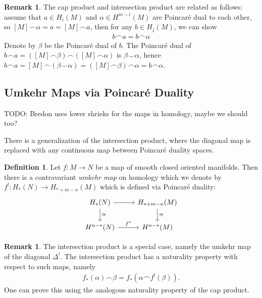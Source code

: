 \documentclass{scrartcl}
\theoremstyle{plain}
\theoremstyle{definition}
\newtheorem{definition}[theorem]{Definition}
\newtheorem{remark}[theorem]{Remark}
\newcommand{\capp}{\mathbin{\frown}}
\newcommand{\cupp}{\mathbin{\smile}}
\newcommand{\iso}{\cong}
\begin{document}
\begin{remark}
The cap product and intersection product are related as follows: assume that $a\in H_i(M)$ and $\alpha\in H^{m-i}(M)$ are Poincaré dual to each other, so $[M]\capp \alpha = a = [M]\capp a$, then for any $b\in H_j(M)$, we can show 
\begin{align*}
    b\capp a = b\capp \alpha 
\end{align*}
Denote by $\beta$ be the Poincaré dual of $b$. The Poincaré dual of  $b\capp a = ([M]\capp \beta) \capp ([M] \capp\alpha)$ is $\beta\cupp\alpha$, hence $b\capp a = [M] \capp (\beta\cupp \alpha) = ([M]\capp \beta) \capp \alpha =  b\capp \alpha$.
\end{remark}

\subsection{Umkehr Maps via Poincaré Duality} \label{subsubsec:umkehr_maps_via_pd}
TODO: Bredon uses lower shrieks for the maps in homology, maybe we should too? 

There is a generalization of the intersection product, where the diagonal map is replaced with any continuous map between Poincaré duality spaces. 

\begin{definition}
Let $f\colon M\to  N$ be a map of smooth closed oriented manifolds. Then there is a contravariant \emph{umkehr map} on homology which we denote by $f^!\colon H_*(N)\to H_{*+m-n}(M)$ which is defined via Poincaré duality:
\begin{equation}
    \begin{tikzcd}
        H_*(N) \dar["\iso"] \rar & H_{*+m-n}(M) \dar["\iso"] \\
        H^{n-*}(N) \rar["f^*"] & H^{n-*}(M)
    \end{tikzcd}
\end{equation}
\end{definition}

\begin{remark}
The intersection product is a special case, namely the umkehr map of the diagonal $\Delta^!$. The intersection product has a naturality property with respect to such maps, namely
\begin{align*}
    f_*(\alpha) \capp \beta = f_*(\alpha \capp f^!(\beta)).
\end{align*}
One can prove this using the analogous naturality property of the cap product.
\end{remark}
\end{document}
